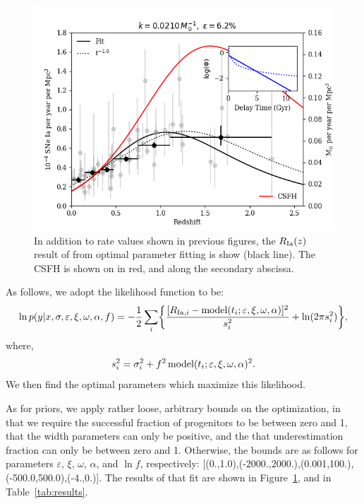 \documentclass[apj]{aastex}
\begin{document}
\begin{figure}[t] %
   \centering
   \includegraphics[width=6.5in]{figure_sfd_optimized} 
   \caption{\footnotesize In addition to rate values shown in previous figures, the $R_{\rm Ia}(z)$ result of from optimal parameter fitting is show (black line). The CSFH is shown on in red, and along the secondary abscissa. }
   \label{fig:sfd_optimized_curvefit}
\end{figure}
	
As follows, we adopt the likelihood function to be:
\begin{equation}
\ln p(y|x, \sigma, \varepsilon, \xi, \omega, \alpha, f) = -\frac{1}{2} \sum_i \biggl\{ \frac{[R_{{\rm Ia},i} - {\rm model}(t_i; \varepsilon, \xi, \omega, \alpha)]^2}{s_i^2}+\ln (2\pi s_i^2)\biggr\},
	\label{eqn:lf}
\end{equation}
where,
\begin{equation}
s_i^2 = \sigma_i^2+f^2\, {\rm model}(t_i; \varepsilon, \xi, \omega, \alpha)^2.
\end{equation}
We then find the optimal parameters which maximize this likelihood.

As for priors, we apply rather loose, arbitrary bounds on the optimization, in that we require the successful fraction of progenitors to be between zero and 1, that the width parameters can only be positive, and the that underestimation fraction can only be between zero and 1. Otherwise, the bounds are as follows for parameters $\varepsilon$, $\xi$, $\omega$, $\alpha$, and $\ln f$, respectively: [(0.,1.0),(-2000.,2000.),(0.001,100.),(-500.0,500.0),(-4.,0.)]. The results of that fit are shown in Figure~\ref{fig:sfd_optimized_curvefit}, and in Table~\ref{tab:results}. 
\end{document}
